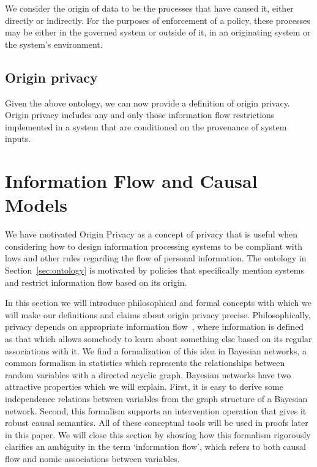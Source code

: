 \documentclass[../thesis.tex]{subfiles}
\begin{document}
We consider the origin of data to be the processes
that have caused it, either directly or indirectly.
For the purposes of enforcement of a policy, these processes
may be either in the governed system or outside of it,
in an originating system or the system's environment.

\subsection{Origin privacy}

Given the above ontology, we can now provide a definition
of origin privacy.
Origin privacy includes any and only those information
flow restrictions implemented in a system that are conditioned
on the provenance of system inputs.
 
\section{Information Flow and Causal Models}
\label{sec:causality}

We have motivated Origin Privacy as a concept of privacy
that is useful when considering how to design
information processing systems to be compliant with
laws and other rules regarding the flow of personal 
information.
The ontology in Section~\ref{sec:ontology} is motivated
by policies that specifically mention systems and
restrict information flow based on its origin.

In this section we will introduce philosophical and formal
concepts with which we will make our definitions and claims
about origin privacy precise.
Philosophically, privacy depends on appropriate
information flow~\cite{nissenbaum09book}, where information is defined
as that which allows somebody to learn about something else
based on its regular associations with it.
We find a formalization of this idea in Bayesian networks,
a common formalism in statistics which represents the
relationships between random variables with a directed
acyclic graph.
Bayesian networks have two attractive properties which
we will explain.
First, it is easy to derive some independence relations
between variables from the graph structure of a Bayesian
network.
Second, this formalism supports an intervention operation
that gives it robust causal semantics.
All of these conceptual tools will be used in proofs
later in this paper.
We will close this section by showing how this formalism
rigorously clarifies an ambiguity in the term `information flow',
which refers to both causal flow and nomic associations between
variables.
\end{document}
